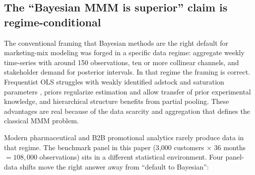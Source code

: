 \documentclass[review,12pt]{elsarticle}
\begin{document}
\subsection{The ``Bayesian MMM is superior'' claim is regime-conditional}
\label{sec:intro:regime}

The conventional framing that Bayesian methods are the right default for
marketing-mix modeling was forged in a specific data regime: aggregate weekly
time-series with around 150 observations, ten or more collinear channels, and
stakeholder demand for posterior intervals. In that regime the framing is
correct. Frequentist OLS struggles with weakly identified adstock and
saturation parameters \cite{jin2017bayesian,chan2017challenges}, priors
regularize estimation and allow transfer of prior
experimental knowledge, and hierarchical structure benefits from partial
pooling. These advantages are real because of the data scarcity and aggregation
that defines the classical MMM problem.

Modern pharmaceutical and B2B promotional analytics rarely produce data in that
regime. The benchmark panel in this paper (3{,}000 customers $\times$ 36 months
$= 108{,}000$ observations) sits in a different statistical environment. Four
panel-data shifts move the right answer away from ``default to Bayesian'':
\end{document}
